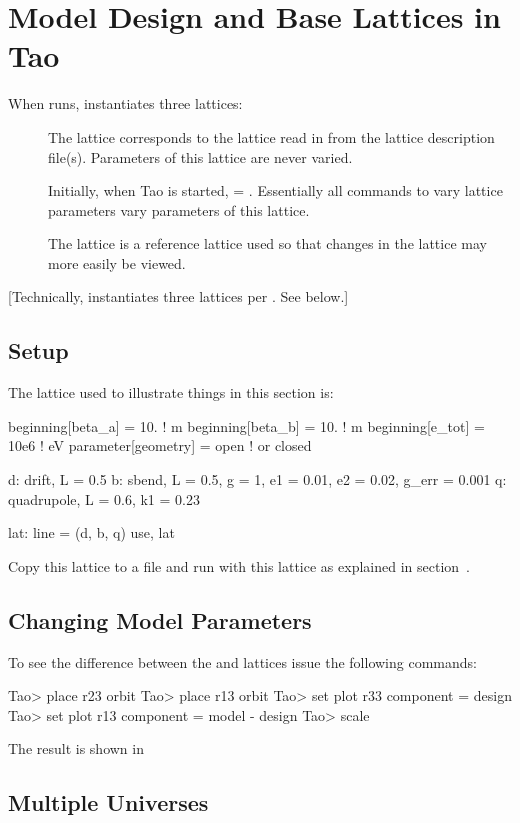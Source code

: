 \documentclass{hitec}
\newcommand{\Section}[1]{\section{#1}\vspace*{-1ex}}
\begin{document}
\newpage

\Section{Model Design and Base Lattices in Tao}

When \tao runs, \tao instantiates three lattices:
\begin{description}
\item[] \Newline
The  lattice corresponds to the lattice read in from the lattice
description file(s). Parameters of this lattice are never varied.
\item[] \Newline
Initially, when Tao is started,  = . Essentially all commands to vary lattice
parameters vary parameters of this lattice.
\item[] \Newline
The  lattice is a reference lattice used so that changes in the  
lattice may more easily be viewed.
\end{description}

[Technically, \tao instantiates three lattices per . See below.]

\subsection{Setup}

The lattice used to illustrate things in this section is:
{\small
\begin{code}
beginning[beta_a] = 10.   ! m
beginning[beta_b] = 10.   ! m
beginning[e_tot] = 10e6   ! eV
parameter[geometry] = open  ! or closed

d: drift, L = 0.5
b: sbend, L = 0.5, g = 1, e1 = 0.01, e2 = 0.02, g_err = 0.001
q: quadrupole, L = 0.6, k1 = 0.23

lat: line = (d, b, q)
use, lat
\end{code}}

Copy this lattice to a file and run \tao with this lattice as explained in section~.

\subsection{Changing Model Parameters}

To see the difference between the  and  lattices issue the following commands:
{\small
\begin{code}
Tao> place r23 orbit
Tao> place r13 orbit
Tao> set plot r33 component = design
Tao> set plot r13 component = model - design
Tao> scale
\end{code}}
The result is shown in 

\subsection{}

\subsection{Multiple Universes}
\end{document}
